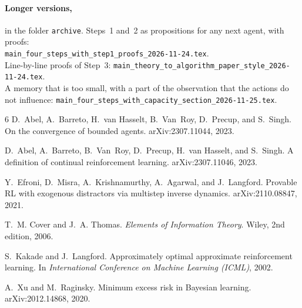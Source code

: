\documentclass[11pt]{article}
\theoremstyle{definition}
\begin{document}
\paragraph{Longer versions,} in the folder \texttt{archive}. Steps~1 and~2 as propositions for any next agent, with proofs:\\ {\small\texttt{main\_four\_steps\_with\_step1\_proofs\_2026-11-24.tex}}.\\ Line-by-line proofs of Step~3: {\small\texttt{main\_theory\_to\_algorithm\_paper\_style\_2026-11-24.tex}}.\\ A memory that is too small, with a part of the observation that the actions do not influence: {\small\texttt{main\_four\_steps\_with\_capacity\_section\_2026-11-25.tex}}.


\begin{thebibliography}{6}
D.~Abel, A.~Barreto, H.~van Hasselt, B.~Van~Roy, D.~Precup, and S.~Singh.
\newblock On the convergence of bounded agents.
\newblock arXiv:2307.11044, 2023.

D.~Abel, A.~Barreto, B.~Van~Roy, D.~Precup, H.~van Hasselt, and S.~Singh.
\newblock A definition of continual reinforcement learning.
\newblock arXiv:2307.11046, 2023.

Y.~Efroni, D.~Misra, A.~Krishnamurthy, A.~Agarwal, and J.~Langford.
\newblock Provable RL with exogenous distractors via multistep inverse dynamics.
\newblock arXiv:2110.08847, 2021.

T.~M. Cover and J.~A. Thomas.
\newblock \emph{Elements of Information Theory}.
\newblock Wiley, 2nd edition, 2006.

S.~Kakade and J.~Langford.
\newblock Approximately optimal approximate reinforcement learning.
\newblock In \emph{International Conference on Machine Learning (ICML)}, 2002.

A.~Xu and M.~Raginsky.
\newblock Minimum excess risk in Bayesian learning.
\newblock arXiv:2012.14868, 2020.
\end{thebibliography}
\end{document}
